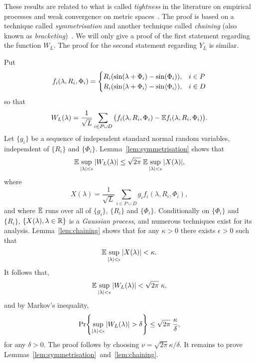 \documentclass[journal]{IEEEtran}
\begin{document}
\begin{IEEEproof}
These results are related to what is called \emph{tightness} in the literature on empirical processes and weak convergence on metric spaces~\cite{Billingsley1999_convergence_of_probability_measures,Dudley_unif_central_lim_th_1999,Shorak_emp_proc_stat_2009}.  The proof is based on a technique called \emph{symmetrisation} and another technique called \emph{chaining} (also known as \emph{bracketing})~\cite{Pollard_asymp_empi_proc_1989}.  We will only give a proof of the first statement regarding the function $W_L$.  The proof for the second statement regarding $Y_L$ is similar.  

Put 
\[
f_i(\lambda, R_i, \Phi_i) = \begin{cases}
R_i( \sin(\lambda + \Phi_i) - \sin(\Phi_i)), & i \in P \\
R_i( \sin\langle \lambda + \Phi_i \rangle - \sin\langle \Phi_i \rangle), & i \in D \\
\end{cases}
\]
so that
\[
W_L(\lambda) = \frac{1}{\sqrt{L}} \sum_{i \in P \cup D} \big( f_i(\lambda, R_i, \Phi_i) - {\mathbb E} f_i(\lambda, R_i, \Phi_i) \big).
\]
Let $\{g_i\}$ be a sequence of independent standard normal random variables, independent of $\{R_i\}$ and $\{\Phi_i\}$.  Lemma~\ref{lem:symmetrisation} shows that
\[
{\mathbb E} \sup_{{\vert \lambda \vert} < \epsilon} {\left\vert  W_L(\lambda) \right\vert} \leq \sqrt{2\pi} \; {\mathbb E} \sup_{{\vert \lambda \vert} < \epsilon}  {\left\vert  X(\lambda)  \right\vert},
\]
where 
\begin{equation}\label{eq:ZpsiCondGaussProc}
X(\lambda) = \frac{1}{\sqrt{L}} \sum_{i \in P \cup D} g_i f_i(\lambda, R_i, \Phi_i),
\end{equation}
and where ${\mathbb E}$ runs over all of $\{g_i\}$, $\{R_i\}$ and $\{\Phi_i\}$.  Conditionally on $\{\Phi_i\}$ and $\{R_i\}$, $\{X(\lambda), \lambda \in {\mathbb R} \}$ is a \emph{Gaussian process}, and numerous techniques exist for its analysis.  Lemma~\ref{lem:chaining} shows that for any $\kappa > 0$ there exists $\epsilon > 0$ such that
\[
{\mathbb E} \sup_{{\vert \lambda \vert} < \epsilon} {\left\vert  X(\lambda)  \right\vert} < \kappa.
\]
It follows that,
\[
{\mathbb E} \sup_{{\vert \lambda \vert} < \epsilon} {\left\vert  W_L(\lambda) \right\vert}  <  \sqrt{2\pi} \; \kappa,
\]
and by Markov's inequality,
\[
{\operatorname{Pr}} {\left\{   \sup_{{\vert \lambda \vert} < \epsilon} {\left\vert  W_L(\lambda) \right\vert} > \delta  \right\}} \leq  \sqrt{2\pi} \; \frac{\kappa}{\delta},
\]
for any $\delta > 0$.  The proof follows by choosing $\nu =  \sqrt{2\pi} \kappa/\delta$.  It remains to prove Lemmas~\ref{lem:symmetrisation}~and~\ref{lem:chaining}.
\end{IEEEproof}
\end{document}
